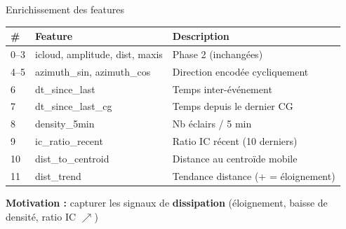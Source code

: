\documentclass[aspectratio=169,10pt]{beamer}
\begin{document}
\begin{frame}{Enrichissement des features}
\small
\begin{tabular}{@{}lll@{}}
\toprule
\textbf{\#} & \textbf{Feature} & \textbf{Description} \\
\midrule
0--3  & icloud, amplitude, dist, maxis & Phase 2 (inchangées) \\
4--5  & azimuth\_sin, azimuth\_cos    & Direction encodée cycliquement \\
6     & dt\_since\_last               & Temps inter-événement \\
7     & dt\_since\_last\_cg           & Temps depuis le dernier CG \\
8     & density\_5min                 & Nb éclairs / 5 min \\
9     & ic\_ratio\_recent             & Ratio IC récent (10 derniers) \\
10    & dist\_to\_centroid            & Distance au centroïde mobile \\
11    & dist\_trend                   & Tendance distance (+ = éloignement) \\
\bottomrule
\end{tabular}

\vspace{0.8em}
\textbf{Motivation :} capturer les signaux de \textbf{dissipation} (éloignement, baisse de densité, ratio IC $\nearrow$)
\end{frame}
\end{document}
